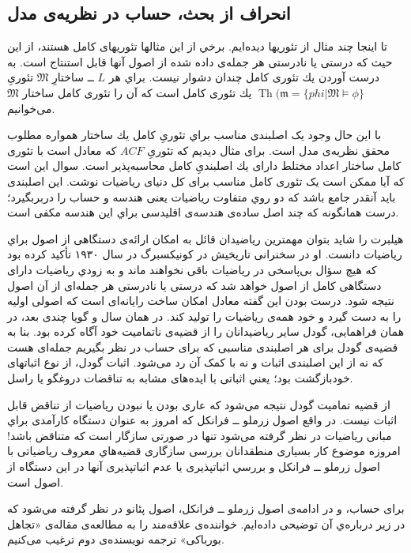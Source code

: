 \documentclass[12pt,a4paper]{report}
\theoremstyle{colorhead}
\DeclareMathOperator{\Th}{Th}
\begin{document}
\subsection{انحراف از بحث، حساب در نظریه‌ی مدل}
تا اينجا چند مثال از تئوریها ديده‌ايم. برخي از اين مثالها تئوریهای كامل هستند، از اين حيث كه درستی يا نادرستی هر جمله‌ی داده شده از اصول آنها قابل استنتاج است. به درست آوردن يك تئوری كامل چندان دشوار نيست. براي هر
$L$ ـ‌ـ
ساختارِ
$\mathfrak{M}$
تئوریِ
$\Th(\mathfrak{m}=\{phi| \mathfrak{M}\models \phi\}$ 
يك تئوری كامل است كه آن را تئوری كامل ساختار
$\mathfrak{M}$
می‌خوانیم.
\par 
 با اين حال وجود یک اصلبندی مناسب براي تئوریِ
  كامل يك ساختار همواره مطلوب محقق نظریه‌ی مدل است. 
  برای مثال ديديم كه تئوریِ
$ACF$
كه معادل است با تئوری كامل ساختار اعداد مختلط
دارای يك اصلبندیِ كامل  محاسبه‌پذير است.
 سوال اين است كه آيا ممکن است یک تئوری كامل مناسب برای كل دنیای رياضيات نوشت. اين اصلبندی بايد آنقدر جامع باشد كه دو روي متفاوت رياضيات یعنی هندسه و حساب را دربربگيرد؛ درست همانگونه كه چند اصل ساده‌ی هندسه‌ی اقليدسی براي اين هندسه مكفی است. 
\par
هيلبرت را شايد بتوان مهمترين رياضيدان قائل به امکان  ارائه‌ی دستگاهی از اصول براي ریاضیات دانست. 
او در سخنرانی تاريخيش در کونیکسبرگ
در سال 
۱۹۳۰
تأکید 
كرده بود كه هيچ سؤال بی‌پاسخی 
در ریاضیات
باقی نخواهند ماند
و به زودي رياضيات دارای دستگاهی كامل از اصول خواهد شد كه درستی یا نادرستی هر جمله‌ای
از آن اصول نتيجه شود. درست بودن اين گفته معادل امكان ساخت رايانه‌ای است كه اصولی اوليه  را به دست گيرد و خود همه‌ی رياضيات را توليد كند.  در همان سال و گويا چندی بعد،‌ در همان فراهمايی، گودل سایر رياضيدانان را از قضيه‌ی ناتماميت  خود آگاه كرده بود. بنا به قضيه‌ی گودل برای هر اصلبندی مناسبی كه برای حساب در نظر بگيريم جمله‌ای هست كه نه از این اصلبندی  اثبات و نه با کمک آن رد می‌شود. اثبات گودل، 
از نوع
اثباتهای خود‌بازگشت بود؛
يعني اثباتی با ایده‌های  مشابه به تناقضات دروغگو يا راسل. 
\par
از قضيه تماميت گودل نتيجه می‌شود كه عاری بودن يا نبودن رياضيات از تناقض قابل اثبات نيست. در واقع اصول زرملو ــ فرانكل كه امروز به عنوان دستگاه کارآمدی براي مبانی رياضيات در نظر گرفته می‌شود تنها در صورتی سازگار است كه متناقض باشد! امروزه موضوع كار بسیاری منطقدانان بررسی سازگاری قضيه‌هاي معروف ریاضیاتی با اصول زرملو ــ فرانكل و بررسي اثباتپذيری يا عدم اثباتپذيری آنها در اين دستگاه از اصول است. 
\par 
برای حساب،‌ و در ادامه‌ی اصول زرملو ــ‌ فرانکل،
اصول پئانو در نظر گرفته مي‌شود كه در زير درباره‌ي آن توضیحی داده‌ايم. خواننده‌ی علاقه‌مند  را به مطالعه‌ی مقاله‌ی «تجاهل بورباكی» ترجمه نويسنده‌ی دوم ترغيب می‌كنيم. 
\end{document}
